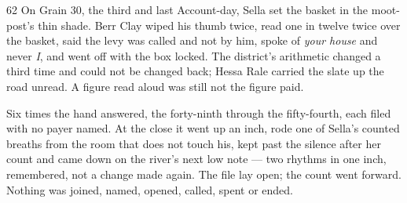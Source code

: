 \begin{CRchronicle}{62}
On Grain 30, the third and last Account-day, Sella set the basket in the moot-post’s thin shade. Berr Clay wiped his thumb twice, read one in twelve twice over the basket, said the levy was called and not by him, spoke of \emph{your house} and never \emph{I}, and went off with the box locked. The district’s arithmetic changed a third time and could not be changed back; Hessa Rale carried the slate up the road unread. A figure read aloud was still not the figure paid.

Six times the hand answered, the forty-ninth through the fifty-fourth, each filed with no payer named. At the close it went up an inch, rode one of Sella’s counted breaths from the room that does not touch his, kept past the silence after her count and came down on the river’s next low note --- two rhythms in one inch, remembered, not a change made again. The file lay open; the count went forward. Nothing was joined, named, opened, called, spent or ended.
\end{CRchronicle}
